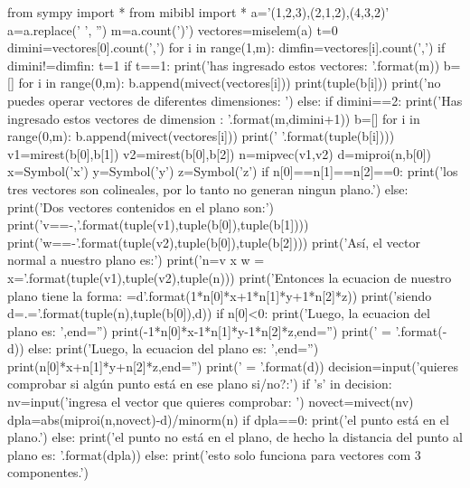 \documentclass[10pt]{article}%
\begin{document}
\begin{pycode}
from sympy import *
from mibibl import *
a='(1,2,3),(2,1,2),(4,3,2)'
a=a.replace(' ', '')
m=a.count(')')
vectores=miselem(a)
t=0
dimini=vectores[0].count(',')
for i in range(1,m):
    dimfin=vectores[i].count(',')
    if dimini!=dimfin:
        t=1
if t==1:
    print('has ingresado estos {} vectores: \n'.format(m))
    b=[]
    for i in range(0,m):
        b.append(mivect(vectores[i]))
        print(tuple(b[i]))
    print('no puedes operar vectores de diferentes dimensiones: ')
else:
    if dimini==2:
        print('Has ingresado estos {} vectores de dimension {}\n: '.format(m,dimini+1))
        b=[]
        for i in range(0,m):
            b.append(mivect(vectores[i]))
            print('{} \n'.format(tuple(b[i])))
        v1=mirest(b[0],b[1])
        v2=mirest(b[0],b[2])
        n=mipvec(v1,v2)
        d=miproi(n,b[0])
        x=Symbol('x')
        y=Symbol('y')
        z=Symbol('z')
        if n[0]==n[1]==n[2]==0:
            print('los tres vectores son colineales, por lo tanto no generan ningun plano.')
        else:
            print('Dos vectores contenidos en el plano son:\n ')
            print('v={}={}-{},'.format(tuple(v1),tuple(b[0]),tuple(b[1])))
            print('w={}={}-{}\n '.format(tuple(v2),tuple(b[0]),tuple(b[2])))
            print('Así, el vector normal a nuestro plano es:\n')
            print('n=v x w = {}x{}={}\n'.format(tuple(v1),tuple(v2),tuple(n)))
            print('Entonces la ecuacion de nuestro plano tiene la forma: {}=d'.format(1*n[0]*x+1*n[1]*y+1*n[2]*z))
            print('siendo d={}.{}={}\n'.format(tuple(n),tuple(b[0]),d))
            if n[0]<0:
                print('Luego, la ecuacion del plano es: ',end='')
                print(-1*n[0]*x-1*n[1]*y-1*n[2]*z,end='')
                print(' = {}'.format(-d))
            else: 
                print('Luego, la ecuacion del plano es: ',end='')
                print(n[0]*x+n[1]*y+n[2]*z,end='')
                print(' = {}'.format(d))
            decision=input('quieres comprobar si algún punto está en ese plano si/no?:')
            if 's' in decision:
                nv=input('ingresa el vector que quieres comprobar: ')
                novect=mivect(nv)
                dpla=abs(miproi(n,novect)-d)/minorm(n)
                if dpla==0:
                    print('el punto está en el plano.')
                else:
                    print('el punto no está en el plano, de hecho la distancia del punto al plano es: {}'.format(dpla))
    else:
        print('esto solo funciona para vectores com 3 componentes.')
\end{pycode}
\end{document}

